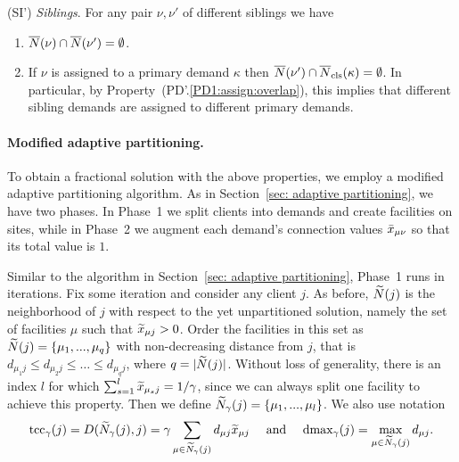 \begin{description}
\begin{enumerate}
	\end{enumerate}
	
\item{(SI')} \emph{Siblings}. For any pair $\nu,\nu'$ of different siblings we have
  \begin{enumerate}

	\item \label{SI1:siblings disjoint}
		  ${\overline{N}}(\nu)\cap {\overline{N}}(\nu') = \emptyset$.
		
	\item \label{SI1:primary disjoint} If $\nu$ is assigned to a primary demand $\kappa$ then
 		${\overline{N}}(\nu')\cap {\overline{N}}_{\text{cls}}(\kappa) = \emptyset$. In particular, by Property~(PD'.\ref{PD1:assign:overlap}),
		this implies that different sibling demands are assigned to different primary demands.

	\end{enumerate}
	
\end{description}


\paragraph{Modified adaptive partitioning.}
To obtain a fractional solution with the above properties,
we employ a modified adaptive partitioning algorithm. As
in Section~\ref{sec: adaptive partitioning}, we have two phases.
In Phase~1 we split clients into demands and create facilities on
sites, while in Phase~2 we augment each demand's
connection values ${\bar x}_{\mu\nu}$ so that its total value is $1$.

Similar to the algorithm in Section~\ref{sec: adaptive partitioning},
Phase~1 runs in iterations. Fix some iteration and consider any client $j$.  As before,
${\widetilde N}(j)$ is the neighborhood of $j$ with respect to the yet
unpartitioned solution, namely the set of facilities $\mu$ such that
${\widetilde x}_{\mu j}>0$. Order the facilities in this set as
${\widetilde N}(j) = { \left\{ \mu_1,...,\mu_q \right\} }$ with non-decreasing
distance from $j$, that is
$d_{\mu_1 j} \leq d_{\mu_2 j} \leq \ldots \leq d_{\mu_q j}$, where
$q = |{\widetilde N}(j)|$. Without loss of generality, there is an index
$l$ for which $\sum_{s=1}^l {\widetilde x}_{\mu_s j} = 1/\gamma$, since we can
always split one facility to achieve this property. Then we define
${\widetilde N}_{\gamma}(j) = { \left\{ \mu_1,...,\mu_l \right\} }$. We also use notation
%
\begin{equation*}
\textrm{tcc}_\gamma(j) =  D({\widetilde N}_\gamma(j), j) = \gamma\sum_{\mu\in{\widetilde N}_{\gamma}(j)} d_{\mu j} {\widetilde x}_{\mu j}
			\quad\textrm{ and }\quad
 \text{dmax}_\gamma(j) = \max_{\mu \in {\widetilde N}_{\gamma}(j)} d_{\mu j}. 
\end{equation*}
%

